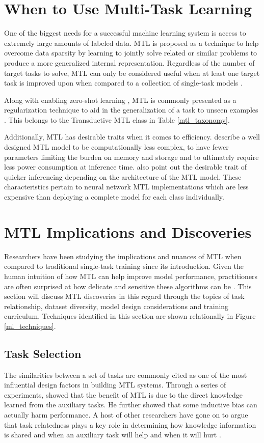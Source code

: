 \documentclass[twocolumn]{article}
\begin{document}
\section{When to Use Multi-Task Learning}
One of the biggest needs for a successful machine learning system is access to extremely large amounts of labeled data. MTL is proposed as a technique to help overcome data sparsity by learning to jointly solve related or similar problems to produce a more generalized internal representation. Regardless of the number of target tasks to solve, MTL can only be considered useful when at least one target task is improved upon when compared to a collection of single-task models \citep{whichtask19}.

Along with enabling zero-shot learning \citep{decanlp18}, MTL is commonly presented as a regularization technique to aid in the generalization of a task to unseen examples \citep{mtl97,mts2sl15,mtdnn19,gpt19}. This belongs to the Transductive MTL class in Table \ref{mtl_taxonomy}.

Additionally, MTL has desirable traits when it comes to efficiency. \cite{bertandpals19} describe a well designed MTL model to be computationally less complex, to have fewer parameters limiting the burden on memory and storage and to ultimately require less power consumption at inference time. \cite{whichtask19} also point out the desirable trait of quicker inferencing depending on the architecture of the MTL model. These characteristics pertain to neural network MTL implementations which are less expensive than deploying a complete model for each class individually.

\section{MTL Implications and Discoveries}
Researchers have been studying the implications and nuances of MTL when compared to traditional single-task training since its introduction. Given the human intuition of how MTL can help improve model performance, practitioners are often surprised at how delicate and sensitive these algorithms can be \citep{whenmtl17,whichtask19}. This section will discuss MTL discoveries in this regard through the topics of task relationship, dataset diversity, model design considerations and training curriculum. Techniques identified in this section are shown relationally in Figure \ref{ml_techniques}.

\subsection{Task Selection}
The similarities between a set of tasks are commonly cited as one of the most influential design factors in building MTL systems. Through a series of experiments, \cite{mtl97} showed that the benefit of MTL is due to the direct knowledge learned from the auxiliary tasks. He further showed that some inductive bias can actually harm performance. A host of other researchers have gone on to argue that task relatedness plays a key role in determining how knowledge information is shared \citep{howtrans16,notion08} and when an auxiliary task will help and when it will hurt \citep{whichtask19,probing19}.
\end{document}
